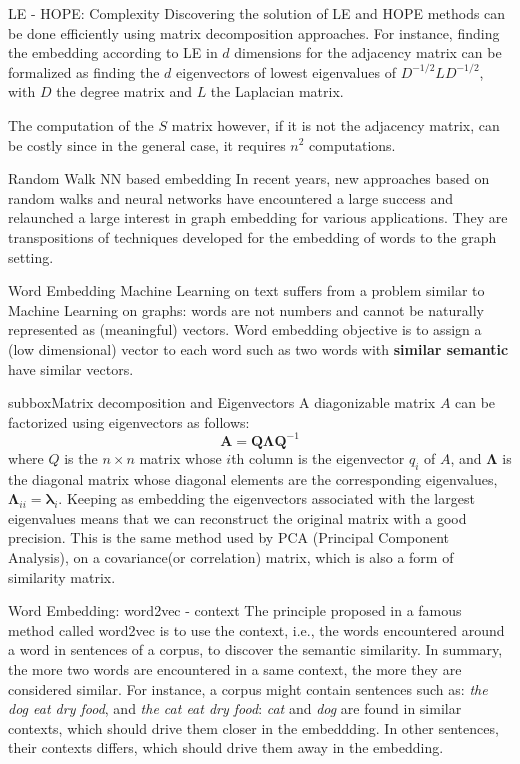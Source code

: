 \documentclass[a4paper,11pt]{book}
\begin{document}
\begin{textbox}{LE - HOPE: Complexity}
Discovering the solution of LE and HOPE methods can be done efficiently using matrix decomposition approaches. For instance, finding the embedding according to LE in $d$ dimensions for the adjacency matrix can be formalized as finding the $d$ eigenvectors of lowest eigenvalues of $D^{-1/2}LD^{-1/2}$, with $D$ the degree matrix and $L$ the Laplacian matrix.

The computation of the $S$ matrix however, if it is not the adjacency matrix, can be costly since in the general case, it requires $n^2$ computations.
\end{textbox}



\begin{textbox}{Random Walk NN based embedding}
In recent years, new approaches based on random walks and neural networks have encountered a large success and relaunched a large interest in graph embedding for various applications. They are transpositions of techniques developed for the embedding of words to the graph setting.
\end{textbox}

\begin{textbox}{Word Embedding}
Machine Learning on text suffers from a problem similar to Machine Learning on graphs: words are not numbers and cannot be naturally represented as (meaningful) vectors. Word embedding objective is to assign a (low dimensional) vector to each word such as two words with \textbf{similar semantic} have similar vectors.
\end{textbox}

\begin{subbox}{subbox}{Matrix decomposition and Eigenvectors}
A diagonizable matrix $A$ can be factorized using eigenvectors as follows:
\[
\mathbf{A}=\mathbf{Q}\mathbf{\Lambda}\mathbf{Q}^{-1}  
\]
where $Q$ is the  $n \times n$ matrix whose $i$th column is the eigenvector $q_i$ of $A$, and $\mathbf{\Lambda}$ is the diagonal matrix whose diagonal elements are the corresponding eigenvalues, $\mathbf{\Lambda}_{ii} = \mathbf{\lambda}_i$. Keeping as embedding the eigenvectors associated with the largest eigenvalues means that we can reconstruct the original matrix with a good precision. This is the same method used by PCA (Principal Component Analysis), on a covariance(or correlation) matrix, which is also a form of similarity matrix.
\end{subbox}

\begin{textbox}{Word Embedding: word2vec - context}
The principle proposed in a famous method called word2vec is to use the context, i.e., the words encountered around a word in sentences of a corpus, to discover the semantic similarity. In summary, the more two words are encountered in a same context, the more they are considered similar. For instance, a corpus might contain sentences such as: \textit{the dog eat dry food}, and \textit{the cat eat dry food}: \textit{cat} and \textit{dog} are found in similar contexts, which should drive them closer in the embeddding. In other sentences, their contexts differs, which should drive them away in the embedding.
\end{textbox}
\end{document}
